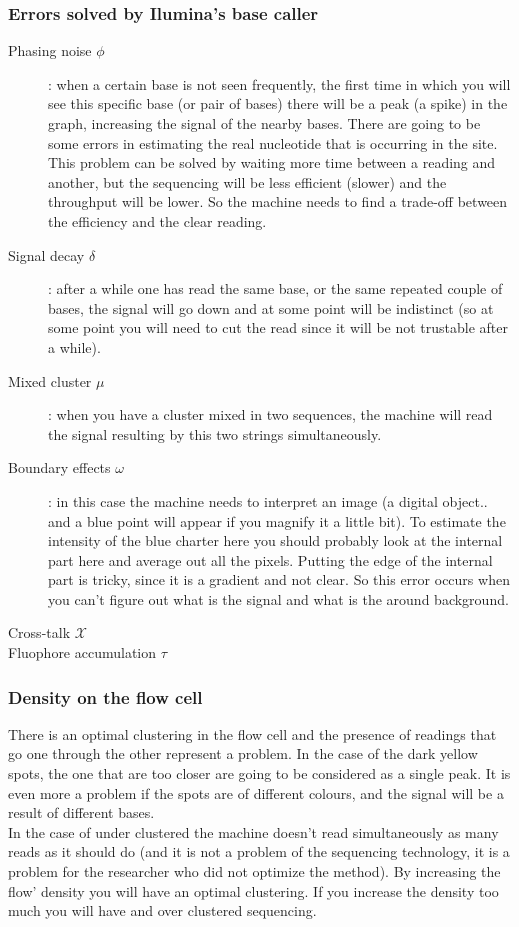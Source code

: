 \begin{description}
\subsubsection{Errors solved by Ilumina's base caller}
\begin{description}
\item[Phasing noise $\phi$]: when a certain base is not seen frequently, the first time in which you will see this specific base (or pair of bases) there will be a peak (a spike) in the graph, increasing the signal of the nearby bases. There are going to be some errors in estimating the real nucleotide that is occurring in the site. This problem can be solved by waiting more time between a reading and another, but the sequencing will be less efficient (slower) and the throughput will be lower. So the machine needs to find a trade-off between the efficiency and the clear reading.
\item[Signal decay $\delta$]: after a while one has read the same base, or the same repeated couple of bases, the signal will go down and at some point will be indistinct (so at some point you will need to cut the read since it will be not trustable after a while).
\item[Mixed cluster $\mu$]: when you have a cluster mixed in two sequences, the machine will read the signal resulting by this two strings simultaneously. 
\item[Boundary effects $\omega$]:  in this case the machine needs to interpret an image (a digital object.. and a blue point will appear if you magnify it a little bit). To estimate the intensity of the blue charter here you should probably look at the internal part here and average out all the pixels. Putting the edge of the internal part is tricky, since it is a gradient and not clear.  So this error occurs when you can’t figure out what is the signal and what is the around background. 
\item[Cross-talk $\mathcal{X}$] %
\item[Fluophore accumulation $\tau$]
\end{description}

\subsubsection{Density on the flow cell}
There is an optimal clustering in the flow cell and the presence of readings that go one through the other represent a problem. In the case of the dark yellow spots, the one that are too closer are going to be considered as a single peak. It is even more a problem if the spots are of different colours, and the signal will be a result of different bases. 
\\
In the case of under clustered the machine doesn’t read simultaneously as many reads as it should do (and it is not a problem of the sequencing technology, it is a problem for the researcher who did not optimize the method). By increasing the flow’ density you will have an optimal clustering. If you increase the density too much you will have and over clustered sequencing. 


\end{description}
